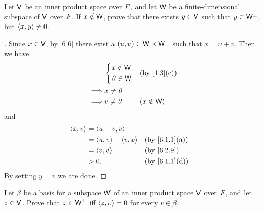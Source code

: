 \setcounter{ex}{5}
\begin{ex}\label{ex:6.2.6}
  Let \(\mathsf{V}\) be an inner product space over \(\mathit{F}\), and let \(\mathsf{W}\) be a finite-dimensional subspace of \(\mathsf{V}\) over \(\mathit{F}\).
  If \(x \notin \mathsf{W}\), prove that there exists \(y \in \mathsf{V}\) such that \(y \in \mathsf{W}^{\perp}\), but \(\left\langle x, y\right\rangle \neq 0\).
\end{ex}

\begin{proof}[]
  Since \(x \in \mathsf{V}\), by \cref{6.6} there exist a \((u, v) \in \mathsf{W} \times \mathsf{W}^{\perp}\) such that \(x = u + v\).
  Then we have
  \begin{align*}
             & \begin{dcases}
                 x \notin \W \\
                 \zv \in \W
               \end{dcases} &  & \by{1.3}[c]     \\
    \implies & x \neq \zv                        \\
    \implies & v \neq \zv     &  & (x \notin \W)
  \end{align*}
  and
  \begin{align*}
    \inn{x, v} & = \inn{u + v, v}                             \\
               & = \inn{u, v} + \inn{v, v} &  & \by{6.1.1}[a] \\
               & = \inn{v, v}              &  & \by{6.2.9}    \\
               & > 0.                      &  & \by{6.1.1}[d]
  \end{align*}
  By setting \(y = v\) we are done.
\end{proof}

\begin{ex}\label{ex:6.2.7}
  Let \(\beta\) be a basis for a subspace \(\mathsf{W}\) of an inner product space \(\mathsf{V}\) over \(\mathit{F}\), and let \(z \in \mathsf{V}\).
  Prove that \(z \in \mathsf{W}^{\perp}\) iff \(\left\langle z, v\right\rangle = 0\) for every \(v \in \beta\).
\end{ex}

